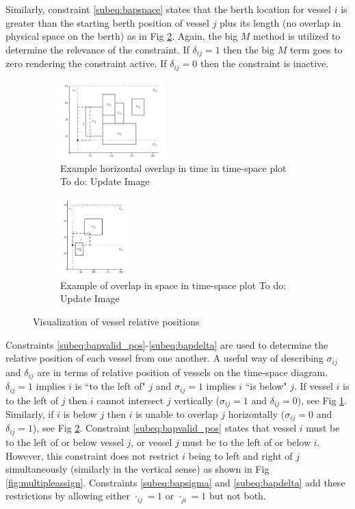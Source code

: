 \documentclass[letterpaper, 10pt, conference]{IEEEtran}
\newcommand{\TODO}[1]{{\color{green} To do: #1}} %
\begin{document}
Similarly, constraint \ref{subeq:bapspace} states that the berth location for vessel \(i\) is greater than the starting berth position of vessel \(j\) plus its length (no overlap in physical space on the berth) as in Fig \ref{subfig:spaceoverlap}. Again, the big \(M\) method is utilized to determine the relevance of the constraint. If \(\delta_{ij} = 1\) then the big \(M\) term goes to zero rendering the constraint active. If \(\delta_{ij} = 0\) then the constraint is inactive.

\begin{figure}
    \centering
    \begin{subfigure}[b]{0.2\textwidth}
        \centering
    	\includegraphics[height=3cm]{hoizontaloverlap.png}
    	\caption{Example horizontal overlap in time in time-space plot\TODO{Update Image}}
    	\label{subfig:timeoverlap}
	\end{subfigure}
	\hfill
    \begin{subfigure}[b]{0.2\textwidth}
        \centering
    	\includegraphics[height=3cm]{verticaloverlap.png}
    	\caption{Example of overlap in space in time-space plot\TODO{Update Image}}
    	\label{subfig:spaceoverlap}
	\end{subfigure}
	\caption{Visualization of vessel relative positions}
	\label{fig:overlap}
\end{figure}

Constraints \ref{subeq:bapvalid_pos}-\ref{subeq:bapdelta} are used to determine the relative position of each vessel from one another. A useful way of describing \(\sigma_{ij}\) and \(\delta_{ij}\) are in terms of relative position of vessels on the time-space diagram. \(\delta_{ij} = 1\) implies \(i\) is ``to the left of" \(j\) and \(\sigma_{ij} = 1\) implies \(i\) ``is below" \(j\). If vessel \(i\) is to the left of \(j\) then \(i\) cannot intersect \(j\) vertically (\(\sigma_{ij} = 1\) and \(\delta_{ij} = 0\)), see Fig \ref{subfig:timeoverlap}. Similarly, if \(i\) is below \(j\) then \(i\) is unable to overlap \(j\) horizontally (\(\sigma_{ij} = 0\) and \(\delta_{ij} = 1\)), see Fig \ref{subfig:spaceoverlap}. Constraint \ref{subeq:bapvalid_pos} states that vessel \(i\) must be to the left of or below vessel \(j\), or vessel \(j\) must be to the left of or below \(i\). However, this constraint does not restrict \(i\) being to left and right of \(j\) simultaneously (similarly in the vertical sense) as shown in Fig \ref{fig:multipleassign}. Constraints \ref{subeq:bapsigma} and \ref{subeq:bapdelta} add these restrictions by allowing either \(\cdot_{ij} = 1\) or \(\cdot_{ji} = 1\) but not both.
\end{document}

